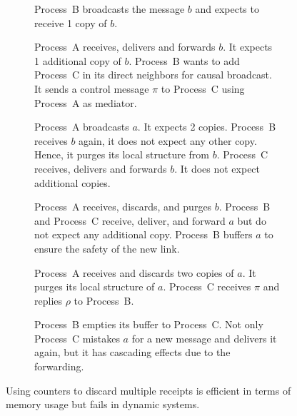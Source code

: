 \begin{figure*}
  \begin{center}
    \begin{subfigure}[t]{0.3\textwidth}
      
      \caption{\label{fig:counterproblemA}Process~B broadcasts the 
        message $b$ and expects to receive 1 copy of $b$.}
    \end{subfigure}
    \begin{subfigure}[t]{0.3\textwidth}
      
      \caption{\label{fig:counterproblemB}Process~A receives, delivers
        and forwards $b$. It expects 1 additional copy of $b$. Process~B wants to 
        add Process~C in its direct neighbors for causal broadcast. It sends a 
        control message $\pi$ to Process~C using Process~A as mediator.}
    \end{subfigure}
    \begin{subfigure}[t]{0.3\textwidth}
      
      \caption{\label{fig:counterproblemC}Process~A broadcasts $a$. It 
        expects 2 copies. Process~B receives $b$ again, it does not expect any other 
        copy. Hence, it purges its local structure from $b$. Process~C receives, 
        delivers and forwards $b$. It does not expect additional copies.}
    \end{subfigure}
    \begin{subfigure}[t]{0.3\textwidth}
      
      \caption{\label{fig:counterproblemD}Process~A receives, discards,
        and purges $b$. Process~B and Process~C receive, deliver, and forward $a$ but
        do not expect any additional copy. Process~B buffers $a$ to ensure the safety 
        of the new link.}
    \end{subfigure}
    \begin{subfigure}[t]{0.3\textwidth}
      
      \caption{\label{fig:counterproblemE}Process~A receives and discards 
        two copies of $a$. It purges its local structure of $a$. Process~C receives
        $\pi$ and replies $\rho$ to Process~B.}
    \end{subfigure}
    \begin{subfigure}[t]{0.3\textwidth}
      
      \caption{\label{fig:counterproblemF}Process~B empties its buffer to
        Process~C. Not only Process~C mistakes $a$ for a new message and
        delivers it again, but it has cascading effects due to the forwarding.}
    \end{subfigure}
    \caption{\label{fig:counterproblem}Using counters to discard multiple
      receipts is efficient in terms of memory usage but fails in dynamic
      systems.}
  \end{center}
\end{figure*}


